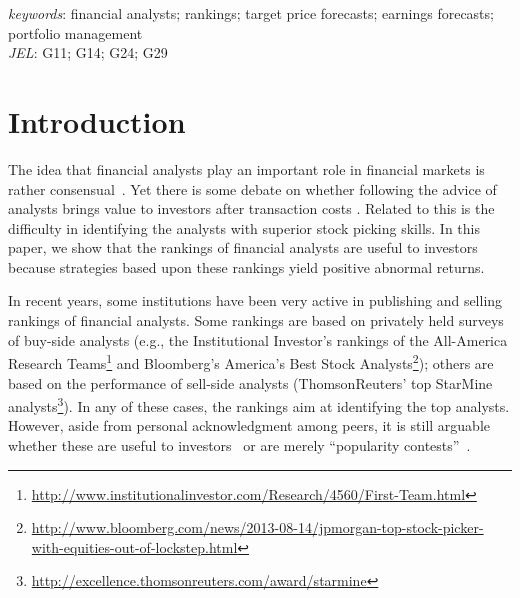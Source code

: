 \documentclass[a4paper,12pt,openright,notitlepage]{report}\usepackage[]{graphicx}\usepackage[]{color}
\newenvironment{knitrout}{}{} %
\begin{document}
\begin{abstract}

\end{abstract}
\textit{keywords}: financial analysts; rankings; target price forecasts; earnings forecasts; portfolio management \\
\textit{JEL}: G11; G14; G24; G29









\begin{knitrout}
\color{fgcolor}



\end{knitrout}

\section{Introduction}
\label{ch1-sec:intro}

The idea that financial analysts play an important role in financial markets is rather consensual~\citep{cowles1933csm,obrien1990}. Yet there is some debate on whether following the advice of analysts brings value to investors after transaction costs \citep{womack1996,mikhail2004sae,li2005persistence}. Related to this is the difficulty in identifying the analysts with superior stock picking skills. In this paper, we show that the rankings of financial analysts are useful to investors because strategies based upon these rankings yield positive abnormal returns.



In recent years, some institutions have been very active in publishing and  selling  rankings of financial analysts. Some rankings  are based on privately held surveys of  buy-side analysts (e.g., the Institutional Investor's rankings of the All-America Research Teams\footnote{\url{http://www.institutionalinvestor.com/Research/4560/First-Team.html}} and Bloomberg's America's Best Stock Analysts\footnote{\sloppy \url{http://www.bloomberg.com/news/2013-08-14/jpmorgan-top-stock-picker-with-equities-out-of-lockstep.html}}); others are based on the performance of sell-side analysts (ThomsonReuters' top StarMine analysts\footnote{\url{http://excellence.thomsonreuters.com/award/starmine}}). In any of these cases, the rankings aim at identifying the top analysts. However, aside from personal acknowledgment among peers, it is still arguable whether these are useful to investors~\citep{desai2000ass} or are merely ``popularity contests''~\citep{emery2009}. %
\end{document}
